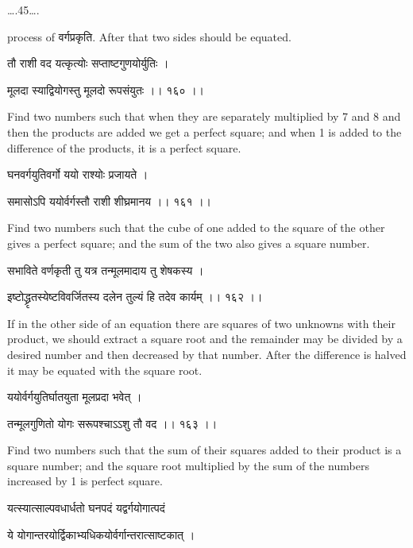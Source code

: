 \documentclass[]{article}
\date{}
\begin{document}
{\ldots{}.45\ldots{}.}

{process of वर्गप्रकृति. After that two sides should be equated.}

{तौ राशी वद यत्कृत्योः सप्ताष्टगुणयोर्युतिः । }

{मूलदा स्याद्वियोगस्तु मूलदो रूपसंयुतः ।। १६० ।। }

{Find two numbers such that when they are separately multiplied by 7 and
8 and then the products are added we get a perfect square; and when 1 is
added to the difference of the products, it is a perfect square.}

{घनवर्गयुतिवर्गो ययो राश्योः प्रजायते । }

{समासोऽपि ययोर्वर्गस्तौ राशी शीघ्रमानय ।। १६१ ।। }

{Find two numbers such that the cube of one added to the square of the
other gives a perfect square; and the sum of the two also gives a square
number.}

{सभाविते वर्णकृती तु यत्र तन्मूलमादाय तु शेषकस्य । }

{इष्टोद्ध्रृतस्येष्टविवर्जितस्य दलेन तुल्यं हि तदेव कार्यम् ।। १६२ ।। }

{If in the other side of an equation there are squares of two unknowns
with their product, we should extract a square root and the remainder
may be divided by a desired number and then decreased by that number.
After the difference is halved it may be equated with the square root.}

{ययोर्वर्गयुतिर्घातयुता मूलप्रदा भवेत् । }

{तन्मूलगुणितो योगः सरूपश्चाऽऽशु तौ वद ।। १६३ ।। }

{Find two numbers such that the sum of their squares added to their
product is a square number; and the square root multiplied by the sum of
the numbers increased by 1 is perfect square.}

{यत्स्यात्साल्पवधार्धतो घनपदं यद्वर्गयोगात्पदं }

{ये योगान्तरयोर्द्विकाभ्यधिकयोर्वर्गान्तरात्साष्टकात् ।}{\\
}
\end{document}
